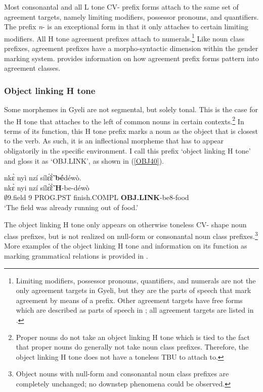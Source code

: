 Most consonantal and all L tone CV- prefix forms attach to the same set of agreement targets, namely limiting modifiers, possessor pronouns, and quantifiers. The prefix {\itshape n}- is an exceptional form in that it only attaches to certain limiting modifiers. All H tone agreement prefixes attach to numerals.\footnote{Limiting modifiers, possessor pronouns, quantifiers, and numerals are not the only agreement targets in Gyeli, but they are the parts of speech that mark agreement by means of a prefix. Other agreement targets have free forms which are described as parts of speech in ; all agreement targets are listed in .} Like noun class prefixes, agreement prefixes have a morpho-syntactic dimension within the gender marking system.  provides information on how agreement prefix forms pattern into agreement classes.


\subsubsection{Object linking H tone}
\label{sec:OBJTone}


Some morphemes in Gyeli are not segmental, but solely tonal. This is the case for the H tone that attaches to the left of common nouns in certain contexts.\footnote{Proper nouns do not take an object linking H tone which is tied to the fact that proper nouns do generally not take noun class prefixes. Therefore, the object linking H tone does not have a toneless TBU to attach to.} In terms of its function, this H tone prefix marks a noun as the object that is closest to the verb. As such, it is an inflectional morpheme that has to appear obligatorily in the specific environment. I call this prefix `object linking H tone' and gloss it as `OBJ.LINK', as shown in (\ref{OBJ40}).

\begin{exe} 
\ex\label{OBJ40}
  \glll nkɛ̀ nyì nzí sílɛ̃́ɛ̃̀ {\bfseries bé}déwò. \\
          nkɛ̀ nyi nzí sílɛ̃́ɛ̃̀ {\bfseries H}-be-déwò \\
          $\emptyset$9.field 9 PROG.PST finish.COMPL {\bfseries OBJ.LINK}-be8-food   \\
    \trans `The field was already running out of food.'
\end{exe}

The object linking H tone only appears on otherwise toneless CV- shape noun class prefixes, but is not realized on null-form or consonantal noun class prefixes.\footnote{Object nouns with null-form and consonantal noun class prefixes are completely unchanged; no downstep phenomena could be observed.}
More examples of the object linking H tone and information on its function as marking grammatical relations is provided in .








